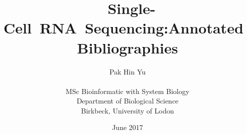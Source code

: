 \documentclass{article}
\title{\mbox{  Single-Cell RNA Sequencing:Annotated Bibliographies}}
\author{ {\LARGE Pak Hin Yu} \\\\ MSc Bioinformatic with System Biology \\ Department of Biological Science\\ Birkbeck, University of Lodon}
\date{June 2017}
\begin{document}
\begin{titlepage}
\maketitle
\end{titlepage}
\end{document}
